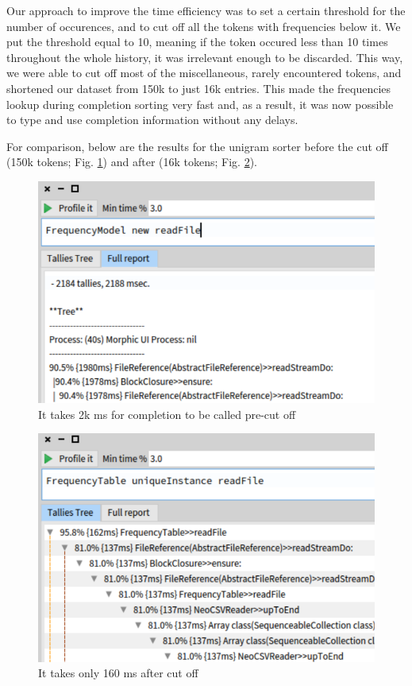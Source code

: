 Our approach to improve the time efficiency was to set a certain threshold for the number of occurences, and to cut off all the tokens with frequencies below it. We put the threshold equal to 10, meaning if the token occured less than 10 times throughout the whole history, it was irrelevant enough to be discarded. This way, we were able to cut off most of the miscellaneous, rarely encountered tokens, and shortened our dataset from 150k to just 16k entries. This made the frequencies lookup during completion sorting very fast and, as a result, it was now possible to type and use completion information without any delays.

For comparison, below are the results for the unigram sorter before the cut off (150k tokens; Fig. \ref{fig:sorterSlow}) and after (16k tokens; Fig. \ref{fig:sorterFast}).

\begin{figure}[H]
    \centering
    \includegraphics[width=0.9\linewidth]{images/sorterSlow.png}
    \caption{It takes 2k ms for completion to be called pre-cut off}
    \label{fig:sorterSlow}
\end{figure}

\begin{figure}[H]
    \centering
    \includegraphics[width=0.9\linewidth]{images/sorterFast.png}
    \caption{It takes only 160 ms after cut off}
    \label{fig:sorterFast}
\end{figure}

